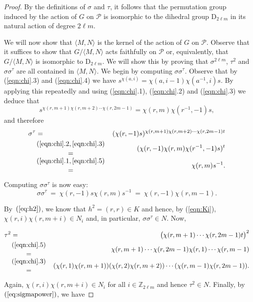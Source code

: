 \documentclass{amsart}
\theoremstyle{definition}
\begin{document}
\begin{proof}
By the definitions of $\sigma$ and $\tau$, it follows that the permutation group induced by the action of $G$ on ${\mathcal P}$ is isomorphic to the dihedral group ${\mathrm D}_{2\ell m}$ in its natural action of degree $2\ell m$.

We will now show that $\langle M,N\rangle$ is the kernel of the action of $G$ on ${\mathcal P}$. Observe that it suffices to show that  $G/\langle M,N\rangle$ acts faithfully on ${\mathcal P}$ or, equivalently, that $G/\langle M,N\rangle$ is isomorphic to ${\mathrm D}_{2\ell m}$. We will show this by proving that $\sigma^{2\ell m}$, $\tau^2$ and $\sigma\sigma^\tau$ are all contained in $\langle M,N\rangle$. We begin by computing $\sigma\sigma^\tau$. Observe that by  (\ref{eqn:chi}.3) and (\ref{eqn:chi}.4) we have $s^{\chi(a,i)} = \chi(a,i-1)\chi(a^{-1},i)s$. By applying this repeatedly and using (\ref{eqn:chi}.1), (\ref{eqn:chi}.2) and (\ref{eqn:chi}.3) we deduce that
$$s^{\chi(r,m+1)\chi(r,m+2)\cdots\chi(r,2m-1)} = \chi(r,m)\chi(r^{-1},-1)s,$$ 
and therefore 
\begin{eqnarray*}
\sigma^\tau&=& (\chi(r,-1)s)^{\chi(r,m+1)\chi(r,m+2)\cdots\chi(r,2m-1)t}\\
&(\ref{eqn:chi}.2, \ref{eqn:chi}.3)\atop=& (\chi(r,-1)\chi(r,m)\chi(r^{-1},-1)s)^t\\
&(\ref{eqn:chi}.1, \ref{eqn:chi}.5)\atop=&\chi(r,m)s^{-1}.
\end{eqnarray*} 

Computing $\sigma\sigma^\tau$ is now easy:
\begin{equation}
\label{eqn:sst}
\sigma\sigma^\tau \> = \> \chi(r,-1)s\chi(r,m)s^{-1} \> = \> \chi(r,-1)\chi(r,m-1).
\end{equation}

By~$(\ref{eq:h2})$, we know that $h^2=(r,r)\in K$ and hence, by (\ref{eqn:Ki}), $\chi(r,i)\chi(r,m+i)\in N_i$ and, in particular, $\sigma\sigma^\tau\in N$. Now,

\begin{eqnarray*}
\tau^2&=& \bigl(\chi(r,m+1)\cdots \chi(r,2m-1)t\bigr)^2\\
&(\ref{eqn:chi}.5)\atop=&\chi(r,m+1)\cdots \chi(r,2m-1)\chi(r,1)\cdots \chi(r,m-1)\\
&(\ref{eqn:chi}.3)\atop=&(\chi(r,1)\chi(r,m+1))(\chi(r,2)\chi(r,m+2))\cdots (\chi(r,m-1)\chi(r,2m-1)).\\
\end{eqnarray*} 

Again, $\chi(r,i)\chi(r,m+i)\in N_i$ for all $i\in{\mathbb Z}_{2\ell m}$ and hence $\tau^2\in N$. Finally, by~$(\ref{eq:sigmapower})$, we have 


\end{proof}
\end{document}
